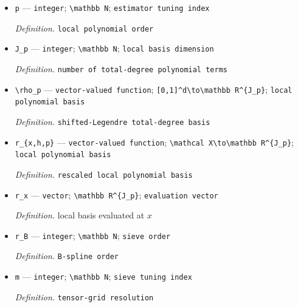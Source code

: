 \documentclass{article}
\begin{document}
\begin{itemize}
  \par\smallskip\noindent\emph{Definition.} \texttt{normalized cube kernel}
  \item \texttt{p} --- \texttt{integer}; \texttt{\textbackslash{}\allowbreak{}mathbb N}; \texttt{estimator tuning index}
  \par\smallskip\noindent\emph{Definition.} \texttt{local polynomial order}
  \item \texttt{J\_\allowbreak{}p} --- \texttt{integer}; \texttt{\textbackslash{}\allowbreak{}mathbb N}; \texttt{local basis dimension}
  \par\smallskip\noindent\emph{Definition.} \texttt{number of total-\allowbreak{}degree polynomial terms}
  \item \texttt{\textbackslash{}\allowbreak{}rho\_\allowbreak{}p} --- \texttt{vector-\allowbreak{}valued function}; \texttt{[0,\allowbreak{}1]\textasciicircum{}d\textbackslash{}\allowbreak{}to\textbackslash{}\allowbreak{}mathbb R\textasciicircum{}\{J\_\allowbreak{}p\}\allowbreak{}}; \texttt{local polynomial basis}
  \par\smallskip\noindent\emph{Definition.} \texttt{shifted-\allowbreak{}Legendre total-\allowbreak{}degree basis}
  \item \texttt{r\_\allowbreak{}\{x,\allowbreak{}h,\allowbreak{}p\}\allowbreak{}} --- \texttt{vector-\allowbreak{}valued function}; \texttt{\textbackslash{}\allowbreak{}mathcal X\textbackslash{}\allowbreak{}to\textbackslash{}\allowbreak{}mathbb R\textasciicircum{}\{J\_\allowbreak{}p\}\allowbreak{}}; \texttt{local polynomial basis}
  \par\smallskip\noindent\emph{Definition.} \texttt{rescaled local polynomial basis}
  \item \texttt{r\_\allowbreak{}x} --- \texttt{vector}; \texttt{\textbackslash{}\allowbreak{}mathbb R\textasciicircum{}\{J\_\allowbreak{}p\}\allowbreak{}}; \texttt{evaluation vector}
  \par\smallskip\noindent\emph{Definition.} local basis evaluated at \(x\)
  \item \texttt{r\_\allowbreak{}B} --- \texttt{integer}; \texttt{\textbackslash{}\allowbreak{}mathbb N}; \texttt{sieve order}
  \par\smallskip\noindent\emph{Definition.} \texttt{B-\allowbreak{}spline order}
  \item \texttt{m} --- \texttt{integer}; \texttt{\textbackslash{}\allowbreak{}mathbb N}; \texttt{sieve tuning index}
  \par\smallskip\noindent\emph{Definition.} \texttt{tensor-\allowbreak{}grid resolution}

\end{itemize}
\end{document}
